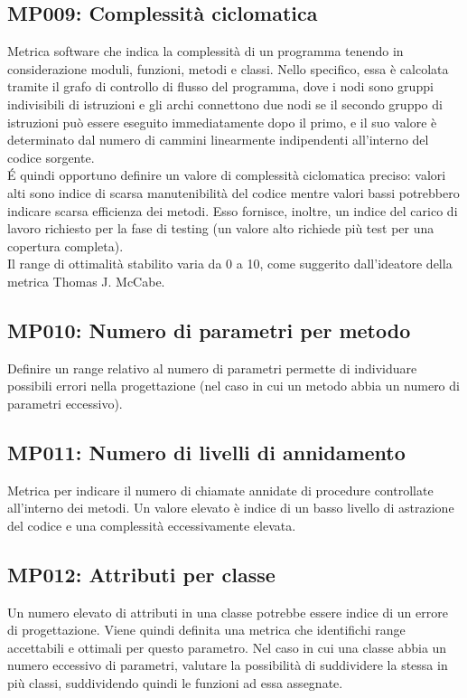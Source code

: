 \subsection{MP009: Complessità ciclomatica}
Metrica software che indica la complessità di un programma tenendo in considerazione moduli, funzioni, metodi e classi.
Nello specifico, essa è calcolata tramite il grafo di controllo di flusso del programma, dove i nodi sono gruppi indivisibili di istruzioni e gli archi connettono due nodi se il secondo gruppo di istruzioni può essere eseguito immediatamente dopo il primo, e il suo valore è determinato dal numero di cammini linearmente indipendenti all'interno del codice sorgente.\\
\'E quindi opportuno definire un valore di complessità ciclomatica preciso: valori alti sono indice di scarsa manutenibilità del codice mentre valori bassi potrebbero indicare scarsa efficienza dei metodi.
Esso fornisce, inoltre, un indice del carico di lavoro richiesto per la fase di testing (un valore alto richiede più test per una copertura completa).\\
Il range di ottimalità stabilito varia da 0 a 10, come suggerito dall'ideatore della metrica Thomas J. McCabe.  

\subsection{MP010: Numero di parametri per metodo}
Definire un range relativo al numero di parametri permette di individuare possibili errori nella progettazione (nel caso in cui un metodo abbia un numero di parametri eccessivo).

\subsection{MP011: Numero di livelli di annidamento}
Metrica per indicare il numero di chiamate annidate di procedure controllate all'interno dei metodi.\newline
Un valore elevato è indice di un basso livello di astrazione del codice e una complessità eccessivamente elevata. 

\subsection{MP012: Attributi per classe}
Un numero elevato di attributi in una classe potrebbe essere indice di un errore di progettazione.
Viene quindi definita una metrica che identifichi range accettabili e ottimali per questo parametro.
Nel caso in cui una classe abbia un numero eccessivo di parametri, valutare la possibilità di suddividere la stessa in più classi, suddividendo quindi le funzioni ad essa assegnate.

